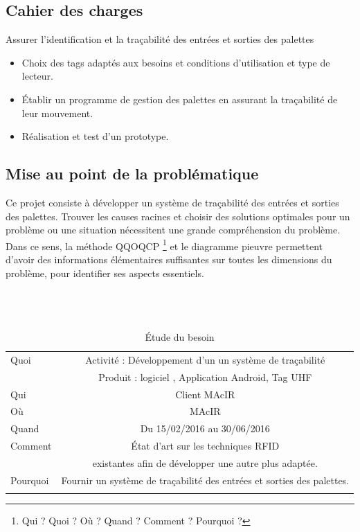 \documentclass[11pt, a4paper, twoside]{book}
\begin{document}
\subsection{Cahier des charges}
Assurer l’identification et la traçabilité des entrées et sorties des palettes
\begin{itemize}
\item Choix des tags adaptés aux besoins et conditions d’utilisation et type de lecteur.
\item Établir un programme de gestion des palettes en assurant la traçabilité de leur mouvement.
\item Réalisation et test d’un prototype.\\
\end{itemize}
\subsection{Mise au point de la problématique}
Ce projet consiste à développer un système de traçabilité des entrées et sorties des palettes. Trouver les causes racines et choisir des solutions optimales pour un problème ou une situation nécessitent une grande compréhension du problème. Dans ce sens, la méthode QQOQCP \footnote{Qui ? Quoi ? Où ? Quand ? Comment ?  Pourquoi ?} et le diagramme pieuvre permettent d'avoir des informations élémentaires suffisantes sur toutes les dimensions du problème, pour identifier ses aspects essentiels.\\\\\\\
        
\begin{longtable}{|l|c|}
  \hline
  Quoi & Activité : Développement d’un un système de traçabilité \\
       &  Produit : logiciel , Application Android, Tag UHF \\
  \hline
  Qui & Client MAcIR\\
  \hline
  Où & MAcIR\\
  \hline
  Quand & Du 15/02/2016 au 30/06/2016\\
  \hline
  Comment & État d’art sur les techniques RFID \\
          &  existantes afin de développer une autre plus adaptée.\\
  \hline
  Pourquoi & Fournir un système de traçabilité des entrées et sorties des palettes.\\
  \hline
  
\caption{Étude du besoin}
\end{longtable}
\end{document}
